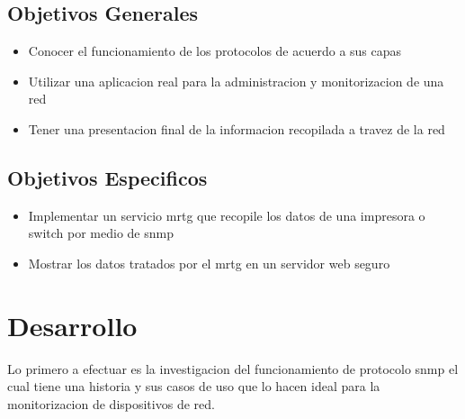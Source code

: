 \documentclass[letterpaper]{article}
\begin{document}
\subsection{Objetivos Generales}\label{sec:objgen}
\begin{itemize}
\item Conocer el funcionamiento de los protocolos de acuerdo a sus capas
\item Utilizar una aplicacion real para la administracion y monitorizacion de una red
\item Tener una presentacion final de la informacion recopilada a travez de la red
\end{itemize}
\subsection{Objetivos Especificos}\label{sec:objgen}
\begin{itemize}
\item Implementar un servicio \acrshort{mrtg} que recopile los datos de una impresora o switch por medio de \acrshort{snmp}
\item Mostrar los datos tratados por el \acrshort{mrtg} en un servidor web seguro
\end{itemize}
\section{Desarrollo}\label{sec:objgen}
Lo primero a efectuar es la investigacion del funcionamiento de protocolo \acrshort{snmp} el cual tiene una historia
y sus casos de uso que lo hacen ideal para la monitorizacion de dispositivos de red.
\end{document}
